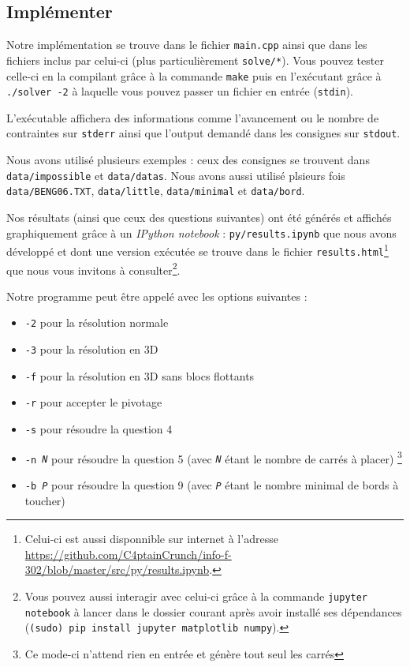 \documentclass[a4paper]{article}
\begin{document}
\subsection{Implémenter}

Notre implémentation se trouve dans le fichier \texttt{main.cpp} ainsi que dans les fichiers inclus par celui-ci (plus particulièrement \texttt{solve/*}). Vous pouvez tester celle-ci en la compilant grâce à la commande \texttt{make} puis en l'exécutant grâce à \texttt{./solver -2} à laquelle vous pouvez passer un fichier en entrée (\texttt{stdin}).

L'exécutable affichera des informations comme l'avancement ou le nombre de contraintes sur \texttt{stderr} ainsi que l'output demandé dans les consignes sur \texttt{stdout}.

Nous avons utilisé plusieurs exemples : ceux des consignes se trouvent dans \texttt{data/impossible} et \texttt{data/datas}. Nous avons aussi utilisé plsieurs fois \texttt{data/BENG06.TXT}, \texttt{data/little}, \texttt{data/minimal} et \texttt{data/bord}.

Nos résultats (ainsi que ceux des questions suivantes) ont été générés et affichés graphiquement grâce à un \textit{IPython notebook} : \texttt{py/results.ipynb} que nous avons développé et dont une version exécutée se trouve dans le fichier \texttt{results.html}\footnote{Celui-ci est aussi disponnible sur internet à l'adresse \url{https://github.com/C4ptainCrunch/info-f-302/blob/master/src/py/results.ipynb}.} que nous vous invitons à consulter\footnote{Vous pouvez aussi interagir avec celui-ci grâce à la commande \texttt{jupyter notebook} à lancer dans le dossier courant après avoir installé ses dépendances (\texttt{(sudo) pip install jupyter matplotlib numpy}).}.

Notre programme peut être appelé avec les options suivantes :
\begin{itemize}
  \item \texttt{-2} pour la résolution normale
  \item \texttt{-3} pour la résolution en 3D
  \item \texttt{-f} pour la résolution en 3D sans blocs flottants
  \item \texttt{-r} pour accepter le pivotage
  \item \texttt{-s} pour résoudre la question 4
  \item \texttt{-n \textit{N}} pour résoudre la question 5 (avec \texttt{\textit{N}} étant le nombre de carrés à placer) \footnote{Ce mode-ci n'attend rien en entrée et génère tout seul les carrés}
  \item \texttt{-b \textit{P}} pour résoudre la question 9 (avec \texttt{\textit{P}} étant le nombre minimal de bords à toucher)
\end{itemize}
\end{document}

